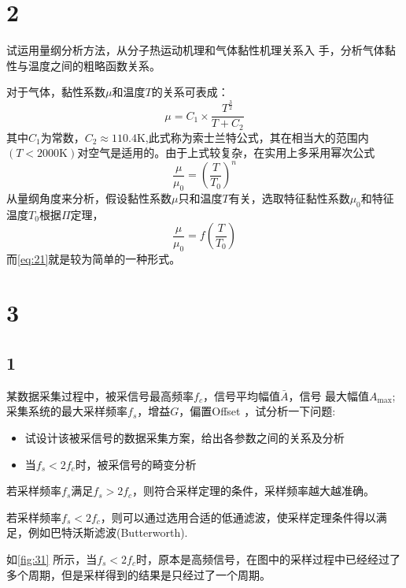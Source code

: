 \documentclass[12pt]{article}
\begin{document}
\section{2}

试运用量纲分析方法，从分子热运动机理和气体黏性机理关系入 手，分析气体黏性与温度之间的粗略函数关系。

对于气体，黏性系数$\mu$和温度$T$的关系可表成：
\begin{equation}
	\mu = C_1 \times \frac{T^{\frac{3}{2}}}{T+C_2}
\end{equation}
其中$C_1$为常数，$C_2\approx 110.4 \mathrm{K} $,此式称为索士兰特公式，其在相当大的范围内$(T<2000 \mathrm{K})$对空气是适用的。由于上式较复杂，在实用上多采用幂次公式
\begin{equation}
	\frac{\mu}{\mu_0} = \left(\frac{T}{T_0}\right)^n
	\label{eq:21}
\end{equation}
从量纲角度来分析，假设黏性系数$\mu$只和温度$T$有关，选取特征黏性系数$\mu_0$和特征温度$T_0$根据$\Pi$定理，
\begin{equation}
	\frac{\mu}{\mu_0} = f\left(\frac{T}{T_0}\right)
\end{equation}
而\cref{eq:21}就是较为简单的一种形式。





\section{3}

\subsection{1}

某数据采集过程中，被采信号最高频率$f_c$，信号平均幅值$\bar{A}$，信号 最大幅值$A_{\max}$;采集系统的最大采样频率$f_s$，增益$G$，偏置Offset ，试分析一下问题:
\begin{itemize}
	\item 试设计该被采信号的数据采集方案，给出各参数之间的关系及分析
	\item 当$f_s < 2f_c$时，被采信号的畸变分析
\end{itemize}

若采样频率$f_s$满足$f_s>2f_c$，则符合采样定理的条件，采样频率越大越准确。

若采样频率$f_s<2f_c$，则可以通过选用合适的低通滤波，使采样定理条件得以满足，例如巴特沃斯滤波(Butterworth).


如\cref{fig:31} 所示，当$f_s < 2f_c$时，原本是高频信号，在图中的采样过程中已经经过了多个周期，但是采样得到的结果是只经过了一个周期。
\end{document}
